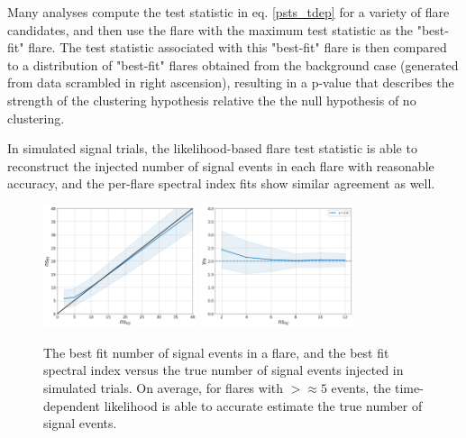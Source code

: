 Many analyses compute the test statistic in eq. \ref{psts_tdep} for a variety of flare candidates, and then use the flare with the maximum test statistic as the "best-fit" flare. The test statistic associated with this "best-fit" flare is then compared to a distribution of "best-fit" flares obtained from the background case (generated from data scrambled in right ascension), resulting in a p-value that describes the strength of the clustering hypothesis relative the the null hypothesis of no clustering. 

In simulated signal trials, the likelihood-based flare test statistic is able to reconstruct the injected number of signal events in each flare with reasonable accuracy, and the per-flare spectral index fits show similar agreement as well. 

\begin{figure}[h]
\centering
\includegraphics[width=0.4\textwidth]{figs/nsfit.png}
\includegraphics[width=0.4\textwidth]{figs/gamfit_2.0.png}
\caption{The best fit number of signal events in a flare, and the best fit spectral index versus the true number of signal events injected in simulated trials. On average, for flares with $> \approx 5$ events, the time-dependent likelihood is able to accurate estimate the true number of signal events.}
\label{fig:perflare_nsfit}
\end{figure}



